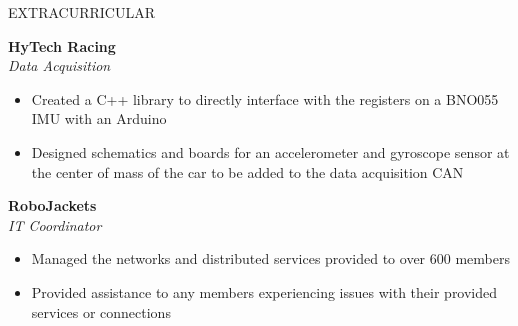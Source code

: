 \documentclass{resume} %
\begin{document}
\vspace{-0.8em}
\begin{rSection}{EXTRACURRICULAR}
\vspace{-1.25em}
\item \textbf{HyTech Racing}\\
\textit{Data Acquisition}
\vspace{-0.5em}
 \begin{itemize}
    \itemsep -5pt {} 
    \item Created a C++ library to directly interface with the registers on a BNO055 IMU with an Arduino
    \item Designed schematics and boards for an accelerometer and gyroscope sensor at the center of mass
    of the car to be added to the data acquisition CAN
 \end{itemize}
\vspace{-0.5em}
\item \textbf{RoboJackets}\\
\textit{IT Coordinator}
\vspace{-0.5em}
 \begin{itemize}
    \itemsep -5pt {} 
    \item Managed the networks and distributed services provided to over 600 members
    \item Provided assistance to any members experiencing issues with their provided services or connections
 \end{itemize}
\end{rSection}
\end{document}
